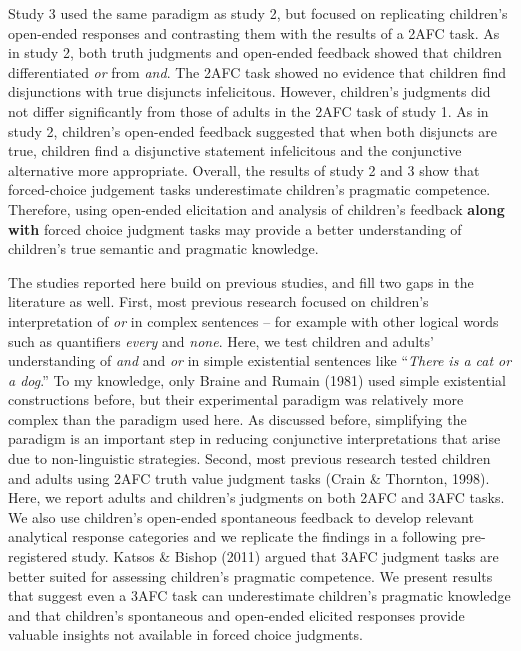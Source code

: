 \documentclass[floatsintext,man]{apa6}
\theoremstyle{definition}
\theoremstyle{definition}
\theoremstyle{definition}
\theoremstyle{remark}
\begin{document}
Study 3 used the same paradigm as study 2, but focused on replicating
children's open-ended responses and contrasting them with the results of
a 2AFC task. As in study 2, both truth judgments and open-ended feedback
showed that children differentiated \emph{or} from \emph{and}. The 2AFC
task showed no evidence that children find disjunctions with true
disjuncts infelicitous. However, children's judgments did not differ
significantly from those of adults in the 2AFC task of study 1. As in
study 2, children's open-ended feedback suggested that when both
disjuncts are true, children find a disjunctive statement infelicitous
and the conjunctive alternative more appropriate. Overall, the results
of study 2 and 3 show that forced-choice judgement tasks underestimate
children's pragmatic competence. Therefore, using open-ended elicitation
and analysis of children's feedback \textbf{along with} forced choice
judgment tasks may provide a better understanding of children's true
semantic and pragmatic knowledge.

The studies reported here build on previous studies, and fill two gaps
in the literature as well. First, most previous research focused on
children's interpretation of \emph{or} in complex sentences -- for
example with other logical words such as quantifiers \emph{every} and
\emph{none}. Here, we test children and adults' understanding of
\emph{and} and \emph{or} in simple existential sentences like
\enquote{\emph{There is a cat or a dog}.} To my knowledge, only Braine
and Rumain (1981) used simple existential constructions before, but
their experimental paradigm was relatively more complex than the
paradigm used here. As discussed before, simplifying the paradigm is an
important step in reducing conjunctive interpretations that arise due to
non-linguistic strategies. Second, most previous research tested
children and adults using 2AFC truth value judgment tasks (Crain \&
Thornton, 1998). Here, we report adults and children's judgments on both
2AFC and 3AFC tasks. We also use children's open-ended spontaneous
feedback to develop relevant analytical response categories and we
replicate the findings in a following pre-registered study. Katsos \&
Bishop (2011) argued that 3AFC judgment tasks are better suited for
assessing children's pragmatic competence. We present results that
suggest even a 3AFC task can underestimate children's pragmatic
knowledge and that children's spontaneous and open-ended elicited
responses provide valuable insights not available in forced choice
judgments.
\end{document}
